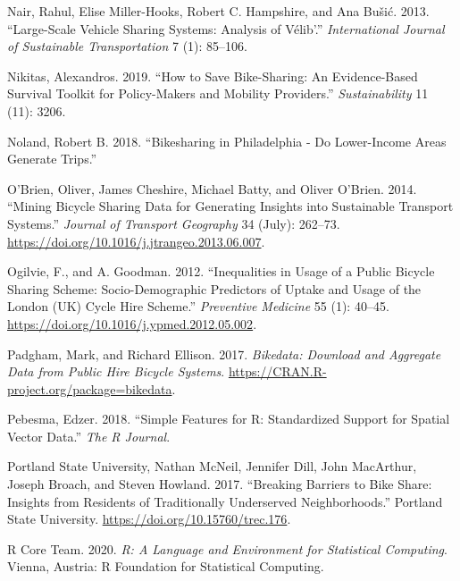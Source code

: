 \documentclass[]{article}
\begin{document}
\leavevmode\hypertarget{ref-nair_large-scale_2013}{}%
Nair, Rahul, Elise Miller-Hooks, Robert C. Hampshire, and Ana Bušić. 2013. ``Large-Scale Vehicle Sharing Systems: Analysis of Vélib'.'' \emph{International Journal of Sustainable Transportation} 7 (1): 85--106.

\leavevmode\hypertarget{ref-nikitas_how_2019}{}%
Nikitas, Alexandros. 2019. ``How to Save Bike-Sharing: An Evidence-Based Survival Toolkit for Policy-Makers and Mobility Providers.'' \emph{Sustainability} 11 (11): 3206.

\leavevmode\hypertarget{ref-noland_bikesharing_2018}{}%
Noland, Robert B. 2018. ``Bikesharing in Philadelphia - Do Lower-Income Areas Generate Trips.''

\leavevmode\hypertarget{ref-obrien_mining_2014}{}%
O'Brien, Oliver, James Cheshire, Michael Batty, and Oliver O'Brien. 2014. ``Mining Bicycle Sharing Data for Generating Insights into Sustainable Transport Systems.'' \emph{Journal of Transport Geography} 34 (July): 262--73. \url{https://doi.org/10.1016/j.jtrangeo.2013.06.007}.

\leavevmode\hypertarget{ref-ogilvie_inequalities_2012}{}%
Ogilvie, F., and A. Goodman. 2012. ``Inequalities in Usage of a Public Bicycle Sharing Scheme: Socio-Demographic Predictors of Uptake and Usage of the London (UK) Cycle Hire Scheme.'' \emph{Preventive Medicine} 55 (1): 40--45. \url{https://doi.org/10.1016/j.ypmed.2012.05.002}.

\leavevmode\hypertarget{ref-padgham_bikedata:_2017}{}%
Padgham, Mark, and Richard Ellison. 2017. \emph{Bikedata: Download and Aggregate Data from Public Hire Bicycle Systems}. \url{https://CRAN.R-project.org/package=bikedata}.

\leavevmode\hypertarget{ref-pebesma_simple_2018}{}%
Pebesma, Edzer. 2018. ``Simple Features for R: Standardized Support for Spatial Vector Data.'' \emph{The R Journal}.

\leavevmode\hypertarget{ref-portland_state_university_breaking_2017}{}%
Portland State University, Nathan McNeil, Jennifer Dill, John MacArthur, Joseph Broach, and Steven Howland. 2017. ``Breaking Barriers to Bike Share: Insights from Residents of Traditionally Underserved Neighborhoods.'' Portland State University. \url{https://doi.org/10.15760/trec.176}.

\leavevmode\hypertarget{ref-R-base}{}%
R Core Team. 2020. \emph{R: A Language and Environment for Statistical Computing}. Vienna, Austria: R Foundation for Statistical Computing.
\end{document}
